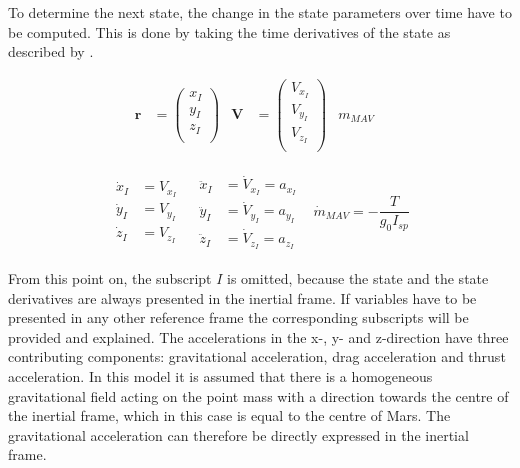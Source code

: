 To determine the next state, the change in the state parameters over time have to be computed. This is done by taking the time derivatives of the state as described by .

\begin{align} \label{eq:stateModel}
\mathbf{r}&=\begin{pmatrix}
x_{I}\\
y_{I}\\
z_{I}\\
\end{pmatrix}
&
\mathbf{V}&=\begin{pmatrix}
V_{x_{I}} \\
V_{y_{I}} \\
V_{z_{I}}\\
\end{pmatrix}
&
m_{MAV}&
\end{align}





\begin{align} \label{eq:state_derivativesModel}
\begin{split} 
\dot{x}_{I}&=V_{x_{I}}\\
\dot{y}_{I}&=V_{y_{I}}\\
\dot{z}_{I}&=V_{z_{I}}
\end{split} 
&
\begin{split}
\ddot{x}_{I}&=\dot{V}_{x_{I}}=a_{x_{I}}\\
\ddot{y}_{I}&=\dot{V}_{y_{I}}=a_{y_{I}}\\
\ddot{z}_{I}&=\dot{V}_{z_{I}}=a_{z_{I}}
\end{split}
&
\dot{m}_{MAV}=-\dfrac{T}{g_{0}I_{sp}}
\end{align}




\noindent
From this point on, the subscript $I$ is omitted, because the state and the state derivatives are always presented in the inertial frame. If variables have to be presented in any other reference frame the corresponding subscripts will be provided and explained. The accelerations in the x-, y- and z-direction have three contributing components: gravitational acceleration, drag acceleration and thrust acceleration. In this model it is assumed that there is a homogeneous gravitational field acting on the point mass with a direction towards the centre of the inertial frame, which in this case is equal to the centre of Mars. The gravitational acceleration can therefore be directly expressed in the inertial frame. 

